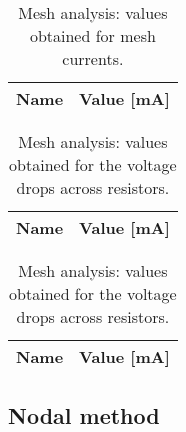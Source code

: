 \begin{table}[h]
  \centering
  \begin{tabular}{|l|r|}
    \hline
    {\bf Name} & {\bf Value [mA]} \\ \hline
    
  \end{tabular}
  \caption{Mesh analysis: values obtained for mesh currents.}
  \label{tab:op1}
\end{table}

\begin{table}
  \parbox{.45\linewidth}{
    \centering
    \begin{tabular}{|c|c|}
      \hline
      {\bf Name} & {\bf Value [mA]} \\ \hline
      
    \end{tabular}
    \caption{Mesh analysis: values obtained for the currents running through the resistors.}
  }
  \hfill
  \parbox{.45\linewidth}{
    \centering
    \begin{tabular}{|c|c|}
      \hline
      {\bf Name} & {\bf Value [mA]} \\ \hline
      
    \end{tabular}
    \caption{Mesh analysis: values obtained for the voltage drops across resistors.}
  }
\end{table}


\subsection{Nodal method}

